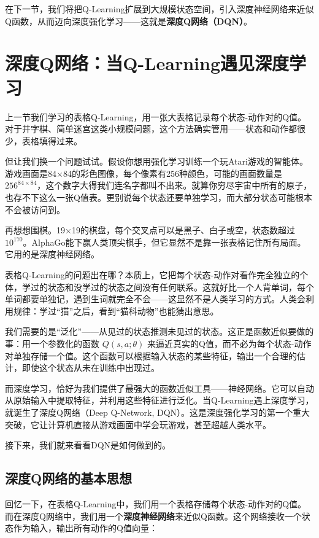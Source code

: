 \documentclass[lang=cn,zihao=-4,a4paper,fontset=windows]{beautybook}
\begin{document}
在下一节，我们将把Q-Learning扩展到大规模状态空间，引入深度神经网络来近似Q函数，从而迈向深度强化学习——这就是\textbf{深度Q网络（DQN）}。

\section{深度Q网络：当Q-Learning遇见深度学习}

上一节我们学习的表格Q-Learning，用一张大表格记录每个状态-动作对的Q值。对于井字棋、简单迷宫这类小规模问题，这个方法确实管用——状态和动作都很少，表格填得过来。

但让我们换一个问题试试。假设你想用强化学习训练一个玩Atari游戏的智能体。游戏画面是84×84的彩色图像，每个像素有256种颜色，可能的画面数量是 \(256^{84\times84}\)，这个数字大得我们连名字都叫不出来。就算你穷尽宇宙中所有的原子，也存不下这么一张Q值表。更别说每个状态还要单独学习，而大部分状态可能根本不会被访问到。

再想想围棋。19×19的棋盘，每个交叉点可以是黑子、白子或空，状态数超过 \(10^{170}\)。AlphaGo能下赢人类顶尖棋手，但它显然不是靠一张表格记住所有局面。它用的是深度神经网络。

表格Q-Learning的问题出在哪？本质上，它把每个状态-动作对看作完全独立的个体，学过的状态和没学过的状态之间没有任何联系。这就好比一个人背单词，每个单词都要单独记，遇到生词就完全不会——这显然不是人类学习的方式。人类会利用规律：学过“猫”之后，看到“猫科动物”也能猜出意思。

我们需要的是“泛化”——从见过的状态推测未见过的状态。这正是函数近似要做的事：用一个参数化的函数 \(Q(s,a;\theta)\) 来逼近真实的Q值，而不必为每个状态-动作对单独存储一个值。这个函数可以根据输入状态的某些特征，输出一个合理的估计，即使这个状态从未在训练中出现过。

而深度学习，恰好为我们提供了最强大的函数近似工具——神经网络。它可以自动从原始输入中提取特征，并利用这些特征进行泛化。当Q-Learning遇上深度学习，就诞生了深度Q网络（Deep Q-Network, DQN）。这是深度强化学习的第一个重大突破，它让计算机直接从游戏画面中学会玩游戏，甚至超越人类水平。

接下来，我们就来看看DQN是如何做到的。

\subsection{深度Q网络的基本思想}

回忆一下，在表格Q-Learning中，我们用一个表格存储每个状态-动作对的Q值。而在深度Q网络中，我们用一个\textbf{深度神经网络}来近似Q函数。这个网络接收一个状态作为输入，输出所有动作的Q值向量：
\end{document}
